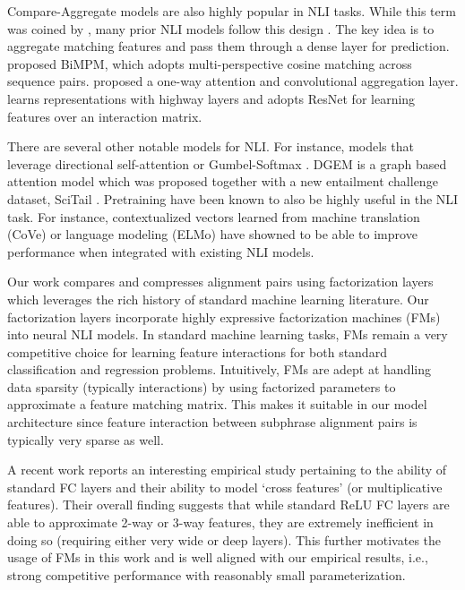 \documentclass[11pt,a4paper]{article}
\begin{document}
Compare-Aggregate models are also highly popular in NLI tasks. While this term was coined by \cite{DBLP:journals/corr/WangJ16b}, many prior NLI models follow this design \cite{DBLP:conf/ijcai/WangHF17,DBLP:conf/emnlp/ParikhT0U16,DBLP:journals/corr/abs-1709-04348,DBLP:conf/acl/ChenZLWJI17}. The key idea is to aggregate matching features and pass them through a dense layer for prediction. \cite{DBLP:conf/ijcai/WangHF17} proposed BiMPM, which adopts multi-perspective cosine matching across sequence pairs. \cite{DBLP:journals/corr/WangJ16b} proposed a one-way attention and convolutional aggregation layer. \cite{DBLP:journals/corr/abs-1709-04348} learns representations with highway layers and adopts ResNet for learning features over an interaction matrix.

There are several other notable models for NLI. For instance, models that leverage directional self-attention \cite{DBLP:journals/corr/abs-1709-04696} or Gumbel-Softmax \cite{choi2017unsupervised}. DGEM is a graph based attention model which was proposed together with a new entailment challenge dataset, SciTail \cite{scitail}. Pretraining have been known to also be highly useful in the NLI task. For instance, contextualized vectors learned from machine translation \cite{mccann2017learned} (CoVe) or language modeling \cite{peters2018deep} (ELMo) have showned to be able to improve performance when integrated with existing NLI models.

Our work compares and compresses alignment pairs using factorization layers which leverages the rich history of standard machine learning literature. Our factorization layers incorporate highly expressive factorization machines (FMs) \cite{rendle2010factorization} into neural NLI models. In standard machine learning tasks, FMs remain a very competitive choice for learning feature interactions \cite{xiao2017attentional} for both standard classification and regression problems. Intuitively, FMs are adept at handling data sparsity (typically interactions) by using factorized parameters to approximate a feature matching matrix. This makes it suitable in our model architecture since feature interaction between subphrase alignment pairs is typically very sparse as well.

A recent work \cite{beutel2018latent} reports an interesting empirical study pertaining to the ability of standard FC layers and their ability to model `cross features' (or multiplicative features). Their overall finding suggests that while standard ReLU FC layers are able to approximate 2-way or 3-way features, they are extremely inefficient in doing so (requiring either very wide or deep layers). This further motivates the usage of FMs in this work and is well aligned with our empirical results, i.e., strong competitive performance with reasonably small parameterization.
\end{document}
